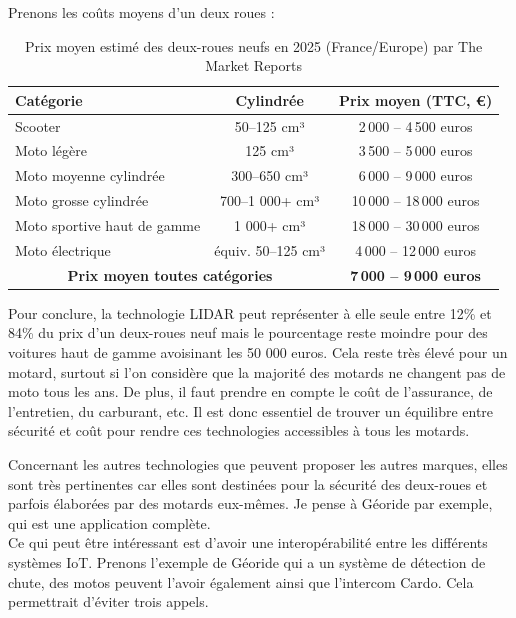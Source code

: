 Prenons les coûts moyens d'un deux roues :\\
\begin{table}[ht]
\centering
\begin{tabular}{|l|c|c|}
\hline
\textbf{Catégorie} & \textbf{Cylindrée} & \textbf{Prix moyen (TTC, €)} \\
\hline
Scooter & 50--125 cm³ & 2\,000 -- 4\,500 euros \\
Moto légère & 125 cm³ & 3\,500 -- 5\,000 euros \\
Moto moyenne cylindrée & 300--650 cm³ & 6\,000 -- 9\,000 euros \\
Moto grosse cylindrée & 700--1 000+ cm³ & 10\,000 -- 18\,000 euros \\
Moto sportive haut de gamme & 1 000+ cm³ & 18\,000 -- 30\,000 euros \\
Moto électrique & équiv. 50--125 cm³ & 4\,000 -- 12\,000 euros \\
\hline
\multicolumn{2}{|c|}{\textbf{Prix moyen toutes catégories}} & \textbf{7\,000 -- 9\,000 euros} \\
\hline
\end{tabular}
\caption{Prix moyen estimé des deux-roues neufs en 2025 (France/Europe) par The Market Reports}
\end{table}

Pour conclure, la technologie LIDAR peut représenter à elle seule entre 12\% et 84\% du prix d'un deux-roues neuf mais le pourcentage reste moindre pour des voitures haut de gamme avoisinant les 50 000 euros. Cela reste très élevé pour un motard, surtout si l'on considère que la majorité des motards ne changent pas de moto tous les ans. De plus, il faut prendre en compte le coût de l'assurance, de l'entretien, du carburant, etc. Il est donc essentiel de trouver un équilibre entre sécurité et coût pour rendre ces technologies accessibles à tous les motards.

Concernant les autres technologies que peuvent proposer les autres marques, elles sont très pertinentes car elles sont destinées pour la sécurité des deux-roues et parfois élaborées par des motards eux-mêmes. Je pense à Géoride par exemple, qui est une application complète.\\
Ce qui peut être intéressant est d'avoir une interopérabilité entre les différents systèmes IoT. Prenons l'exemple de Géoride qui a un système de détection de chute, des motos peuvent l'avoir également ainsi que l'intercom Cardo. Cela permettrait d'éviter trois appels.

